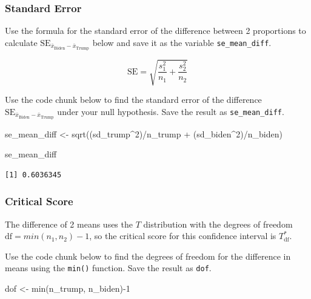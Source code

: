 \documentclass[
  letterpaper,
  DIV=11,
  numbers=noendperiod]{scrartcl}
\newenvironment{Shaded}{\begin{snugshade}}{\end{snugshade}}
\newcommand{\DecValTok}[1]{\textcolor[rgb]{0.68,0.00,0.00}{#1}}
\newcommand{\FunctionTok}[1]{\textcolor[rgb]{0.28,0.35,0.67}{#1}}
\newcommand{\NormalTok}[1]{\textcolor[rgb]{0.00,0.23,0.31}{#1}}
\newcommand{\OtherTok}[1]{\textcolor[rgb]{0.00,0.23,0.31}{#1}}
\newcommand{\SpecialCharTok}[1]{\textcolor[rgb]{0.37,0.37,0.37}{#1}}
\begin{document}
\subsubsection{Standard Error}\label{standard-error-1}

Use the formula for the standard error of the difference between 2
proportions to calculate
\(\text{SE}_{\bar{x}_{\text{Biden}}-\bar{x}_{\text{Trump}}}\) below and
save it as the variable \texttt{se\_mean\_diff}.

\[
\text{SE}=\sqrt{\frac{s_1^2}{n_1}+\frac{s_2^2}{n_2}}
\]

Use the code chunk below to find the standard error of the difference
\(\text{SE}_{\bar{x}_{\text{Biden}}-\bar{x}_{\text{Trump}}}\) under your
null hypothesis. Save the result as \texttt{se\_mean\_diff}.

\begin{Shaded}
\begin{Highlighting}[]
\NormalTok{se\_mean\_diff }\OtherTok{\textless{}{-}} \FunctionTok{sqrt}\NormalTok{((sd\_trump}\SpecialCharTok{\^{}}\DecValTok{2}\NormalTok{)}\SpecialCharTok{/}\NormalTok{n\_trump }\SpecialCharTok{+}\NormalTok{ (sd\_biden}\SpecialCharTok{\^{}}\DecValTok{2}\NormalTok{)}\SpecialCharTok{/}\NormalTok{n\_biden)}

\NormalTok{se\_mean\_diff}
\end{Highlighting}
\end{Shaded}

\begin{verbatim}
[1] 0.6036345
\end{verbatim}

\subsubsection{Critical Score}\label{critical-score-1}

The difference of 2 means uses the \(T\) distribution with the degrees
of freedom \(\text{df}=min(n_1, n_2)-1\), so the critical score for this
confidence interval is \(T^*_{\text{df}}\).

Use the code chunk below to find the degrees of freedom for the
difference in means using the \texttt{min()} function. Save the result
as \texttt{dof}.

\begin{Shaded}
\begin{Highlighting}[]
\NormalTok{dof }\OtherTok{\textless{}{-}} \FunctionTok{min}\NormalTok{(n\_trump, n\_biden)}\SpecialCharTok{{-}}\DecValTok{1}
\end{Highlighting}
\end{Shaded}
\end{document}
